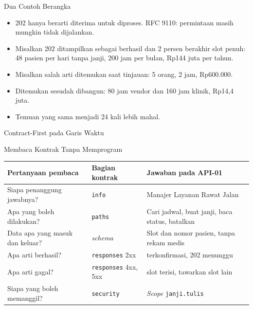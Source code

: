 \documentclass[aspectratio=169, table, 12pt]{beamer}
\begin{document}
\begin{frame}{{\Large Dua Contoh Berangka}}
  \vspace{8pt}
  \begin{itemize}
    \item 202 hanya berarti diterima untuk diproses. RFC 9110: permintaan masih mungkin tidak dijalankan.
    \item Misalkan 202 ditampilkan sebagai berhasil dan 2 persen berakhir slot penuh: 48 pasien per hari tanpa janji, 200 jam per bulan, Rp144 juta per tahun.
    \item Misalkan salah arti ditemukan saat tinjauan: 5 orang, 2 jam, Rp600.000.
    \item Ditemukan sesudah dibangun: 80 jam vendor dan 160 jam klinik, Rp14,4 juta.
    \item Temuan yang sama menjadi 24 kali lebih mahal.
  \end{itemize}
\end{frame}

\begin{frame}{{\Large Contract-First pada Garis Waktu}}
  \centering
\end{frame}

\begin{frame}{{\Large Membaca Kontrak Tanpa Memprogram}}
  \footnotesize
  \begin{tabularx}{\textwidth}{>{\raggedright\arraybackslash}X >{\raggedright\arraybackslash}p{2.6cm} >{\raggedright\arraybackslash}X}
    \hline
    \textbf{Pertanyaan pembaca} & \textbf{Bagian kontrak} & \textbf{Jawaban pada API-01} \\ \hline
    Siapa penanggung jawabnya? & \texttt{info} & Manajer Layanan Rawat Jalan \\ \hline
    Apa yang boleh dilakukan? & \texttt{paths} & Cari jadwal, buat janji, baca status, batalkan \\ \hline
    Data apa yang masuk dan keluar? & \textit{schema} & Slot dan nomor pasien, tanpa rekam medis \\ \hline
    Apa arti berhasil? & \texttt{responses} 2xx & 201 terkonfirmasi, 202 menunggu \\ \hline
    Apa arti gagal? & \texttt{responses} 4xx, 5xx & 409 slot terisi, tawarkan slot lain \\ \hline
    Siapa yang boleh memanggil? & \texttt{security} & \textit{Scope} \texttt{janji.tulis} \\ \hline
  \end{tabularx}
\end{frame}
\end{document}
